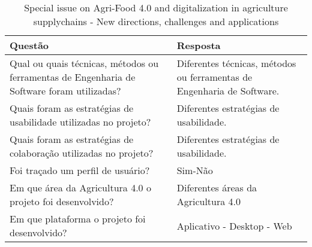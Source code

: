 \documentclass[12pt]{article}
\begin{document}
\begin{table}[!htb]
	\footnotesize
  \centering
	\begin{tabular}{|p{8cm}|p{6cm}|}
		\hline
		\textbf{Questão}                                                                           & \textbf{Resposta}                                                      \\ \hline
		Qual ou quais técnicas, métodos ou ferramentas de Engenharia de Software foram utilizadas? & Diferentes técnicas, métodos ou ferramentas de Engenharia de Software. \\ \hline
		Quais foram as estratégias de usabilidade utilizadas no projeto?                           & Diferentes estratégias de usabilidade.                                 \\ \hline
		Quais foram as estratégias de colaboração utilizadas no projeto?                           & Diferentes estratégias de usabilidade.                                 \\ \hline
		Foi traçado um perfil de usuário?                                                          & Sim-Não                                                                \\ \hline
		Em que área da Agricultura 4.0 o projeto foi desenvolvido?                                 & Diferentes áreas da Agricultura 4.0                                    \\ \hline
		Em que plataforma o projeto foi desenvolvido?                                              & Aplicativo - Desktop - Web                                 \\ \hline
		\end{tabular}
  \caption{Special issue on Agri-Food 4.0 and digitalization in agriculture supplychains - New directions, challenges and applications}
  \label{tab:extracao2}
\end{table}
\end{document}
